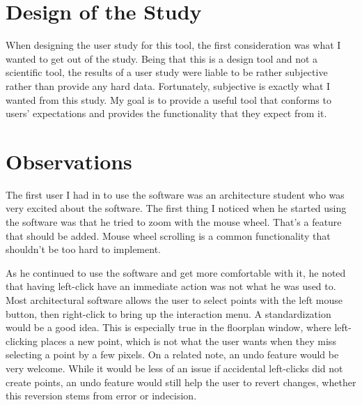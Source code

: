 \documentclass{thesis}
\begin{document}
\section{Design of the Study}
When designing the user study for this tool, the first consideration was what I wanted to get out of the study.  Being that this is
a design tool and not a scientific tool, the results of a user study were liable to be rather subjective rather than provide any hard
data.  Fortunately, subjective is exactly what I wanted from this study.  My goal is to provide a useful tool that conforms to users'
expectations and provides the functionality that they expect from it.

\section{Observations}
The first user I had in to use the software was an architecture student who was very excited about the software.
The first thing I noticed when he started using the software was that he tried to zoom with the mouse wheel.  That's a feature that
should be added.  Mouse wheel scrolling is a common functionality that shouldn't be too hard to implement.

As he continued to use the software and get more comfortable with it, he noted that having left-click have an immediate action was not
what he was used to. Most architectural software allows the user to select points with the left mouse button, then right-click to
bring up the interaction menu.  A standardization would be a good idea.  This is especially true in the floorplan window, where
left-clicking places a new point, which is not what the user wants when they miss selecting a point by a few pixels.  On a related
note, an undo feature would be very welcome.  While it would be less of an issue if accidental left-clicks did not create points,
an undo feature would still help the user to revert changes, whether this reversion stems from error or indecision.
\end{document}
